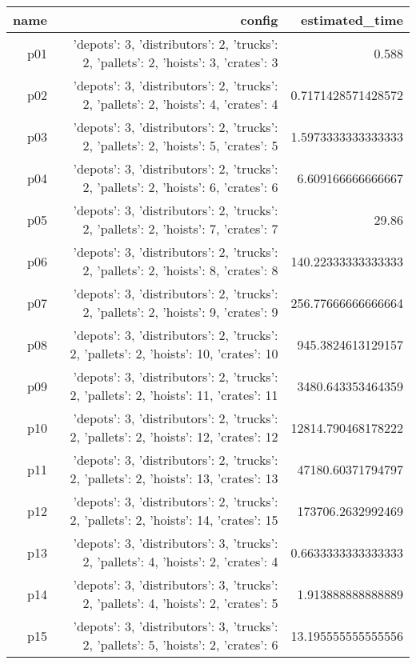 \documentclass{article}
\begin{document}
                            \begin{center}
                            \scriptsize
                            \begin{tabular}{r|r|r}
                            name & config & estimated\_time\\\midrule
                              p01&{'depots': 3, 'distributors': 2, 'trucks': 2, 'pallets': 2, 'hoists': 3, 'crates': 3}&0.588\\
  p02&{'depots': 3, 'distributors': 2, 'trucks': 2, 'pallets': 2, 'hoists': 4, 'crates': 4}&0.7171428571428572\\
  p03&{'depots': 3, 'distributors': 2, 'trucks': 2, 'pallets': 2, 'hoists': 5, 'crates': 5}&1.5973333333333333\\
  p04&{'depots': 3, 'distributors': 2, 'trucks': 2, 'pallets': 2, 'hoists': 6, 'crates': 6}&6.609166666666667\\
  p05&{'depots': 3, 'distributors': 2, 'trucks': 2, 'pallets': 2, 'hoists': 7, 'crates': 7}&29.86\\
  p06&{'depots': 3, 'distributors': 2, 'trucks': 2, 'pallets': 2, 'hoists': 8, 'crates': 8}&140.22333333333333\\
  p07&{'depots': 3, 'distributors': 2, 'trucks': 2, 'pallets': 2, 'hoists': 9, 'crates': 9}&256.77666666666664\\
  p08&{'depots': 3, 'distributors': 2, 'trucks': 2, 'pallets': 2, 'hoists': 10, 'crates': 10}&945.3824613129157\\
  p09&{'depots': 3, 'distributors': 2, 'trucks': 2, 'pallets': 2, 'hoists': 11, 'crates': 11}&3480.643353464359\\
  p10&{'depots': 3, 'distributors': 2, 'trucks': 2, 'pallets': 2, 'hoists': 12, 'crates': 12}&12814.790468178222\\
  p11&{'depots': 3, 'distributors': 2, 'trucks': 2, 'pallets': 2, 'hoists': 13, 'crates': 13}&47180.60371794797\\
  p12&{'depots': 3, 'distributors': 2, 'trucks': 2, 'pallets': 2, 'hoists': 14, 'crates': 15}&173706.2632992469\\
  p13&{'depots': 3, 'distributors': 3, 'trucks': 2, 'pallets': 4, 'hoists': 2, 'crates': 4}&0.6633333333333333\\
  p14&{'depots': 3, 'distributors': 3, 'trucks': 2, 'pallets': 4, 'hoists': 2, 'crates': 5}&1.913888888888889\\
  p15&{'depots': 3, 'distributors': 3, 'trucks': 2, 'pallets': 5, 'hoists': 2, 'crates': 6}&13.195555555555556\\

\end{tabular}
\end{center}
\end{document}
